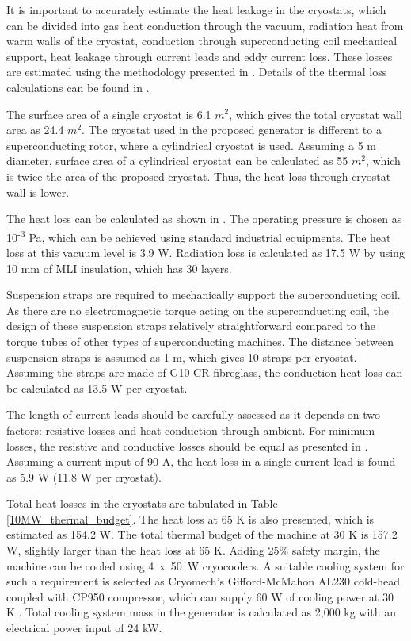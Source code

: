 \documentclass[12pt]{iopart}
\begin{document}
It is important to accurately estimate the heat leakage in the cryostats, which can be divided into gas heat conduction through the vacuum, radiation heat from  warm walls of the cryostat, conduction through superconducting coil mechanical support, heat leakage through current leads and eddy current loss. These losses are estimated using the methodology presented in \cite{Abrahamsen2012, Simons2013, Ekin206,Zhu2014}. Details of the thermal loss calculations can be found in \cite{Keysan2014c}.


The surface area of a single cryostat is 6.1 $m^2$, which gives the total cryostat wall area as 24.4 $m^2$. The cryostat used in the proposed generator is different to a superconducting rotor, where a cylindrical cryostat is used. Assuming a 5 m diameter, surface area of a cylindrical cryostat can be calculated as 55 $m^2$, which is twice the area of the proposed cryostat. Thus, the heat loss through cryostat wall is lower.

The heat loss can be calculated as shown in \cite{Ekin206}. The operating pressure is chosen as 10\textsuperscript{-3} Pa, which can be achieved using standard industrial equipments. The heat loss at this vacuum level is 3.9 W. Radiation loss is calculated as 17.5 W by using 10 mm of MLI insulation, which has 30 layers.

Suspension straps are required to mechanically support the superconducting coil. As there are no electromagnetic torque acting on the superconducting coil, the design of these suspension straps relatively straightforward compared to the torque tubes of other types of superconducting machines. The distance between suspension straps is assumed as 1 m, which gives 10 straps per cryostat. Assuming the straps are made of G10-CR fibreglass, the conduction heat loss can be calculated as 13.5 W per cryostat.

The length of current leads should be carefully assessed as it depends on two factors: resistive losses and heat conduction through ambient. For minimum losses, the resistive and conductive losses should be equal as presented in \cite{Kalsi2011a}. Assuming a current input of 90 A, the heat loss in a single current lead is found as 5.9 W (11.8 W per cryostat).

Total heat losses in the cryostats are tabulated in Table \ref{10MW_thermal_budget}. The heat loss at 65 K is also presented, which is estimated as 154.2 W. The total thermal budget of the machine  at 30 K is 157.2 W, slightly larger than the heat loss at 65 K. Adding 25\% safety margin, the machine can be cooled using 4~x~50~W cryocoolers. A suitable cooling system for such a requirement is selected as Cryomech's Gifford-McMahon AL230 cold-head coupled with CP950 compressor, which can supply 60 W of cooling power at 30 K \cite{Cryomech2007}. Total cooling system mass in the generator is calculated as 2,000 kg with an electrical power input of 24 kW.
\end{document}
